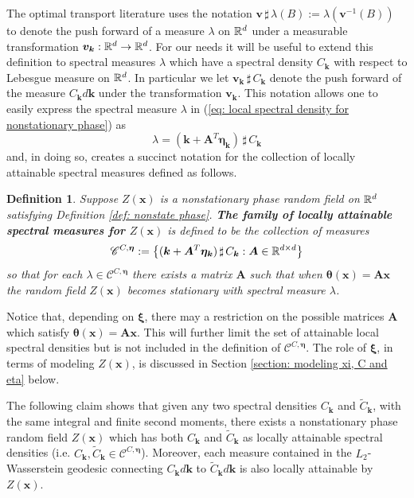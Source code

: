 \documentclass[10pt,noinfoline]{imsart}
\newtheorem{definition}{Definition}
\newcommand{\bs}{\boldsymbol}
\begin{document}
The optimal transport literature uses the notation $\bs v \,\sharp\, \lambda(B) := \lambda(\bs v^{-1}(B))$ to denote the push forward of a measure $\lambda$ on $\Bbb R^d$ under a measurable transformation $\bs v_{\bs k}:\Bbb R^d\rightarrow \Bbb R^d$. For our needs it will be useful to extend this definition to spectral measures $\lambda$ which have a spectral density $C_{\bs k}$  with respect to Lebesgue measure on $\Bbb R^d$.  In particular we let $\bs v_{\bs k}\,\sharp\, C_{\bs k}$ denote the push forward of the measure  $C_{\bs k}d\bs k$ under the transformation $\bs v_{\bs k}$. This notation allows one to easily express the spectral measure $\lambda$  in (\ref{eq: local spectral density for nonstationary phase}) as 
\[
\lambda= (\bs k+ \bs A^T \bs\eta_{\bs k})\,\sharp\, C_{\bs k}
\]
and, in doing so, creates a succinct notation for the collection of locally attainable spectral measures defined  as follows.


\begin{definition}
Suppose $Z(\bs x)$ is a nonstationary phase random field on $\Bbb R^d$ satisfying Definition \ref{def: nonstate phase}. \textit{\textbf{The family of locally attainable spectral measures for $Z(\bs x)$}} is defined to be the collection of measures
\[
\mathscr C^{C,\bs\eta}:= \big\{ (\bs k+ \bs A^T \bs\eta_{\bs k})\,\sharp\, C_{\bs k}: \bs A \in \Bbb R^{d\times d}\big\}
\] 
so that for each $\lambda \in \mathscr C^{C,\bs\eta}$ there exists a matrix $\bs A$ such that when $\bs \theta(\bs x) = \bs A\bs x$ the random field $Z(\bs x)$ becomes stationary with spectral measure $\lambda$.
\end{definition}


Notice that, depending on $\bs \xi$, there may a restriction on the possible matrices $\bs A$ which satisfy $\bs \theta(\bs x) = \bs A\bs x$. This will further limit the set of attainable local spectral densities but is not included in the definition of $\mathscr C^{C,\bs \eta}$. The role of $\bs \xi$, in terms of modeling $Z(\bs x)$, is discussed in Section \ref{section: modeling xi, C and eta} below.


The following claim shows that given any two spectral densities $C_{\bs k}$ and $\tilde C_{\bs k}$, with the same integral and finite second moments, there exists a nonstationary phase random field $
Z(\bs x)$ which has both $C_{\bs k}$ and $\tilde C_{\bs k}$ as locally attainable spectral densities (i.e. $C_{\bs k},\tilde C_{\bs k}\in\mathscr C^{C,\bs \eta}$). Moreover, each measure contained in the $L_2$-Wasserstein geodesic connecting $C_{\bs k}d\bs k$ to $\tilde C_{\bs k}d\bs k$ is also locally attainable by $Z(\bs x)$.
\end{document}
